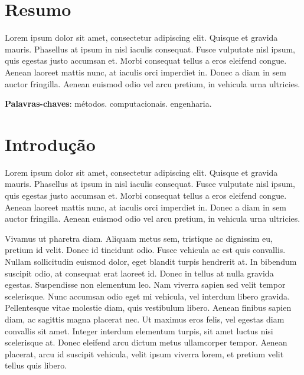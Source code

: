 \documentclass[a4paper, 12pt, openright, oneside]{article}
\begin{document}
\newpage
\newpage
\tableofcontents
\thispagestyle{empty}

\newpage
{}
\section*{Resumo}

Lorem ipsum dolor sit amet, consectetur adipiscing elit. Quisque et gravida mauris. Phasellus at ipsum in nisl iaculis consequat. Fusce vulputate nisl ipsum, quis egestas justo accumsan et. Morbi consequat tellus a eros eleifend congue. Aenean laoreet mattis nunc, at iaculis orci imperdiet in. Donec a diam in sem auctor fringilla. Aenean euismod odio vel arcu pretium, in vehicula urna ultricies. 

 \noindent
 \textbf{Palavras-chaves}: métodos. computacionais. engenharia.
\newpage



\section{Introdução}


Lorem ipsum dolor sit amet, consectetur adipiscing elit. Quisque et gravida mauris. Phasellus at ipsum in nisl iaculis consequat. Fusce vulputate nisl ipsum, quis egestas justo accumsan et. Morbi consequat tellus a eros eleifend congue. Aenean laoreet mattis nunc, at iaculis orci imperdiet in. Donec a diam in sem auctor fringilla. Aenean euismod odio vel arcu pretium, in vehicula urna ultricies.

Vivamus ut pharetra diam. Aliquam metus sem, tristique ac dignissim eu, pretium id velit. Donec id tincidunt odio. Fusce vehicula ac est quis convallis. Nullam sollicitudin euismod dolor, eget blandit turpis hendrerit at. In bibendum suscipit odio, at consequat erat laoreet id. Donec in tellus at nulla gravida egestas. Suspendisse non elementum leo. Nam viverra sapien sed velit tempor scelerisque. Nunc accumsan odio eget mi vehicula, vel interdum libero gravida. Pellentesque vitae molestie diam, quis vestibulum libero. Aenean finibus sapien diam, ac sagittis magna placerat nec. Ut maximus eros felis, vel egestas diam convallis sit amet. Integer interdum elementum turpis, sit amet luctus nisi scelerisque at. Donec eleifend arcu dictum metus ullamcorper tempor. Aenean placerat, arcu id suscipit vehicula, velit ipsum viverra lorem, et pretium velit tellus quis libero.
\end{document}
